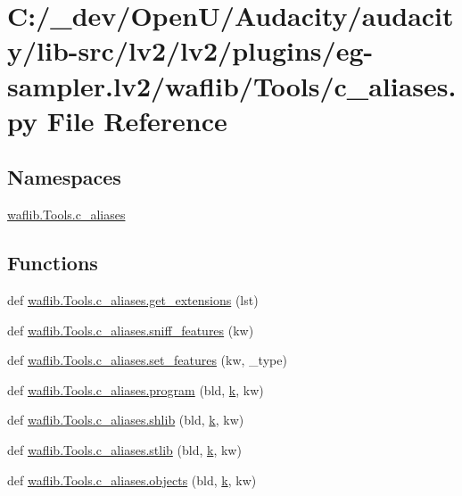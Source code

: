\hypertarget{lv2_2plugins_2eg-sampler_8lv2_2waflib_2_tools_2c__aliases_8py}{}\section{C\+:/\+\_\+dev/\+Open\+U/\+Audacity/audacity/lib-\/src/lv2/lv2/plugins/eg-\/sampler.lv2/waflib/\+Tools/c\+\_\+aliases.py File Reference}
\label{lv2_2plugins_2eg-sampler_8lv2_2waflib_2_tools_2c__aliases_8py}
\subsection*{Namespaces}
\begin{DoxyCompactItemize}
\item 
 \hyperlink{namespacewaflib_1_1_tools_1_1c__aliases}{waflib.\+Tools.\+c\+\_\+aliases}
\end{DoxyCompactItemize}
\subsection*{Functions}
\begin{DoxyCompactItemize}
\item 
def \hyperlink{namespacewaflib_1_1_tools_1_1c__aliases_a2c236bc286989e7a4856c0c855d7867d}{waflib.\+Tools.\+c\+\_\+aliases.\+get\+\_\+extensions} (lst)
\item 
def \hyperlink{namespacewaflib_1_1_tools_1_1c__aliases_a5dc841eb61d3c43326b4c75f23c8f771}{waflib.\+Tools.\+c\+\_\+aliases.\+sniff\+\_\+features} (kw)
\item 
def \hyperlink{namespacewaflib_1_1_tools_1_1c__aliases_a9676c4aa7388b63dcb8146ee0b1eabb7}{waflib.\+Tools.\+c\+\_\+aliases.\+set\+\_\+features} (kw, \+\_\+type)
\item 
def \hyperlink{namespacewaflib_1_1_tools_1_1c__aliases_a37f66fad92eb3e5608e4ea6cc919987c}{waflib.\+Tools.\+c\+\_\+aliases.\+program} (bld, \hyperlink{rfft2d_test_m_l_8m_adc468c70fb574ebd07287b38d0d0676d}{k}, kw)
\item 
def \hyperlink{namespacewaflib_1_1_tools_1_1c__aliases_abe1769b56363a382ee98a9ffbd9fcc3c}{waflib.\+Tools.\+c\+\_\+aliases.\+shlib} (bld, \hyperlink{rfft2d_test_m_l_8m_adc468c70fb574ebd07287b38d0d0676d}{k}, kw)
\item 
def \hyperlink{namespacewaflib_1_1_tools_1_1c__aliases_ac17e9b8cf40b90cb8f7a0262e1b6208e}{waflib.\+Tools.\+c\+\_\+aliases.\+stlib} (bld, \hyperlink{rfft2d_test_m_l_8m_adc468c70fb574ebd07287b38d0d0676d}{k}, kw)
\item 
def \hyperlink{namespacewaflib_1_1_tools_1_1c__aliases_a7b447b92707b996e71d30214f7b28555}{waflib.\+Tools.\+c\+\_\+aliases.\+objects} (bld, \hyperlink{rfft2d_test_m_l_8m_adc468c70fb574ebd07287b38d0d0676d}{k}, kw)
\end{DoxyCompactItemize}
